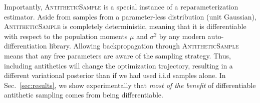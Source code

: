 Importantly, \textsc{AntitheticSample} is a special instance of a reparameterization estimator. Aside from samples from a parameter-less distribution (unit Gaussian), \textsc{AntitheticSample} is completely deterministic, meaning that it is differentiable with respect to the population moments $\mu$ and $\sigma^2$ by any modern auto-differentiation library.
Allowing backpropagation through \textsc{AntitheticSample} means that any free parameters are aware of the sampling strategy. Thus, including antithetics will change the optimization trajectory, resulting in a different variational posterior than if we had used i.i.d  samples alone. In Sec.~\ref{sec:results}, we show experimentally that \textit{most of the benefit} of differentiable antithetic sampling comes from being differentiable.

